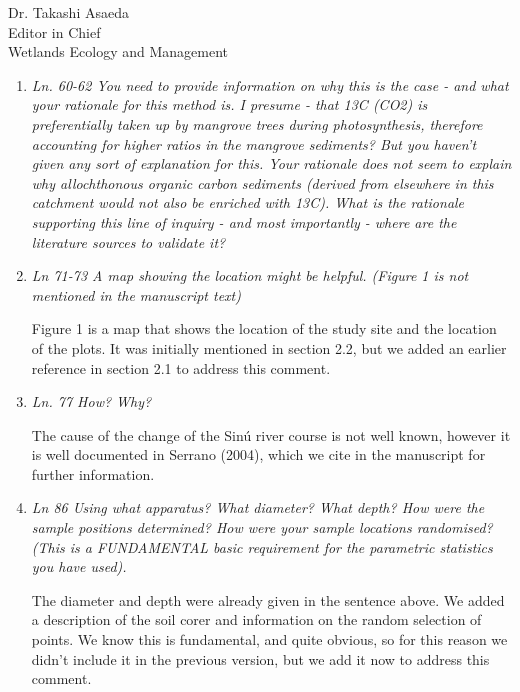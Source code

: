 \documentclass[11pt]{bgcletter}
\begin{document}
\begin{letter}{Dr. Takashi Asaeda\\
 Editor in Chief \\ Wetlands Ecology and Management}
\begin{enumerate}
{\color{blue} Habitat and environmental characteristics of the basing and fringe mangroves are described in the Mathrials and Methods section. Here in the introduction, we are describing the main motivation of the study and therefore it is not the most appropriate place to describe the study site. Figure 1 is mentioned in the text in the Methods section.}

\item {\it Ln. 60-62 You need to provide information on why this is the case - and what your rationale for this method is. I presume - that 13C (CO2) is preferentially taken up by mangrove trees during photosynthesis, therefore accounting for higher ratios in the mangrove sediments? But you haven't given any sort of explanation for this. Your rationale does not seem to explain why allochthonous organic carbon sediments (derived from elsewhere in this catchment would not also be enriched with 13C). What is the rationale supporting this line of inquiry - and most importantly - where are the literature sources to validate it?}

\item {\it Ln 71-73 A map showing the location might be helpful. (Figure 1 is not mentioned in the manuscript text)}

{\color{blue} Figure 1 is a map that shows the location of the study site and the location of the plots. It was initially mentioned in section 2.2, but we added an earlier reference in section 2.1 to address this comment.}

\item {\it Ln. 77 How? Why?}

{\color{blue} The cause of the change of the Sin\'u river course is not well known, however it is well documented in Serrano (2004), which we cite in the manuscript for further information.}

\item {\it Ln 86 Using what apparatus? What diameter? What depth? How were the sample positions determined? How were your sample locations randomised? (This is a FUNDAMENTAL basic requirement for the parametric statistics you have used).}

{\color{blue} The diameter and depth were already given in the sentence above. We added a description of the soil corer and information on the random selection of points. We know this is fundamental, and quite obvious, so for this reason we didn't include it in the previous version, but we add it now to address this comment.}


\end{enumerate}
\end{letter}
\end{document}
